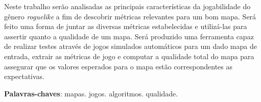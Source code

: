 \begin{resumo}
 Neste trabalho serão analisadas as principais características da jogabilidade do gênero \textit{roguelike} a fim de descobrir métricas relevantes para um bom mapa. Será feito uma forma de juntar as diversas métricas estabelecidas e utilizá-las para assertir quanto a qualidade de um mapa. Será produzido uma ferramenta capaz de realizar testes através de jogos simulados automáticos para um dado mapa de entrada, extrair as métricas de jogo e computar a qualidade total do mapa para assegurar que os valores esperados para o mapa estão correspondentes as expectativas. 
 
 \begin{comment}
 
 Apesar de usarem tão fortemente conteúdos gerados proceduralmente, ainda hoje não é possível obter uma boa métrica de forma precisa quanto qualidade de seus mapas. Normalmente tendo a adequação dos seus mapas gerados através de muitos testes e apenas do sentimento obtido após muitas partidas.
 
 Não há nada de errado com esta forma, porém se houvesse uma ferramenta capaz de produzir métricas de análise para os mapas randômicamente gerados de forma relativamente rápida, isto poderia acelerar o processo de aperfeiçoamento dos algoritmos devido a redução em parte do tempo de testes. 
 
 Neste projeto, será desenvolvido um sistema capaz de obter um mapa e testa-lo através de uma série de métricas para assegurar a qualidade do mapa em relação a qualidade desejada. Na segunda parte do projeto será realizado uma analise comparativa para indicar se mapas proceduralmente gerados podem possuir metricas similares a mapas construidos manualmente e como usuários reais se sentem em relação as métricas obtidas, assegurando a confiança do sistema em seus resultados. 
\end{comment}
 \vspace{\onelineskip}
    
 \noindent
 \textbf{Palavras-chaves}: mapas. jogos. algoritmos. qualidade.
\end{resumo}
